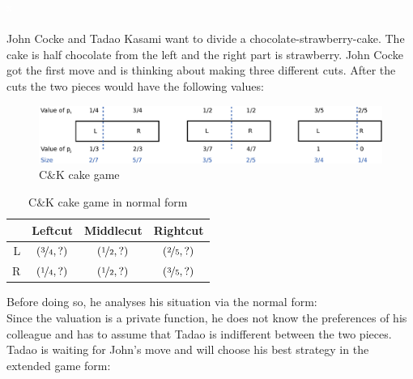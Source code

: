 \begin{bsp}
\label{bsp1}
\textcolor{white}{x}\\\\
John Cocke and Tadao Kasami want to divide a chocolate-strawberry-cake. The cake is half chocolate from the left and the right part is strawberry. John Cocke got the first move and is thinking about making three different cuts. After the cuts the two pieces would have the following values:
	\begin{figure}[!h]
		\centering
 		 \includegraphics[width=390pt]{bilder/ex1.pdf}
   \caption{C$\&$K cake game}
  	 \end{figure}
  	 \newline
\begin{table}[htb]
\centering
 \renewcommand{\arraystretch}{1.2} 
\begin{tabular}{c|c|c|c|}
\cline{2-4}
&\multicolumn{1}{|c|}{{Leftcut}}& {Middlecut}&{Rightcut}\\
\hline
\multicolumn{1}{|r|}{{L}}&$\left(\nicefrac{3}{4}, ?\right)$&$\left(\nicefrac{1}{2}, ?\right)$&$\left(\nicefrac{2}{5}, ?\right)$\\
\hline
\multicolumn{1}{|r|}{{R}}&$\left(\nicefrac{1}{4}, ?\right)$&$\left(\nicefrac{1}{2}, ?\right)$&$\left(\nicefrac{3}{5}, ?\right)$\\
\hline
\end{tabular}
\caption{C$\&$K cake game in normal form}\label{Table1}
\end{table}
Before doing so, he analyses his situation via the normal form:\\Since the valuation is a private function, he does not know the preferences of his colleague and has to assume that Tadao is indifferent between the two pieces. %
Tadao is waiting for John's move and will choose his best strategy in the extended game form: 
\begin{figure}[h!]
\begin{center}

\end{center}
\end{figure}
\end{bsp}
